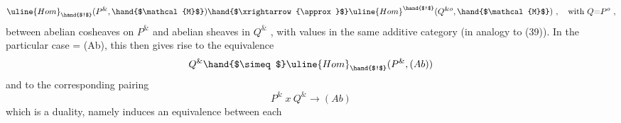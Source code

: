 \margin{(***)}
\[ \uline{Hom}_{\hand{$!$}}(P^{\&}, \hand{$\mathcal{M}$}) \hand{$\xrightarrow{\approx}$} \uline{Hom}^{\hand{$!$}}(Q^{\& o}, \hand{$\mathcal{M}$}) \ , \quad \text{with } Q{=}P^{o} \ , \]
between abelian cosheaves on $P^{\&}$ and abelian sheaves in $Q^{\&}$ , with values
in the same  additive category (in analogy to (39)). In the
particular case = (Ab), this then gives rise to the equivalence
\[ Q^{\&} \hand{$\simeq$} \uline{Hom}_{\hand{$!$}}(P^{\&}, (Ab)) \]
and to the corresponding pairing
\[ P^{\&} \ x \ Q^{\&} \longrightarrow (Ab) \]
which is a duality, namely induces an equivalence between each 

